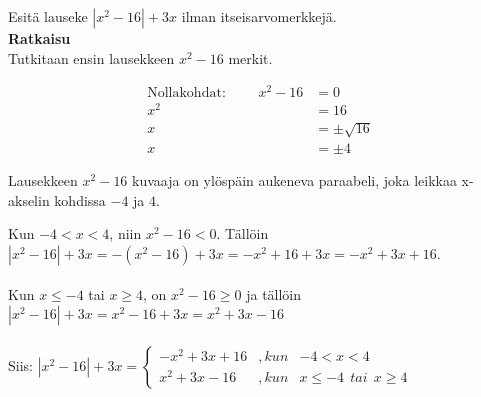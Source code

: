 \begin{esimerkki}
	Esitä lauseke $|x^2-16|+3x$ ilman itseisarvomerkkejä.\\
	\textbf{Ratkaisu} \\
	Tutkitaan ensin lausekkeen $x^2-16$ merkit.
	
	\begin{align*}
		\text{Nollakohdat: } \qquad	x^2-16 &=0 \\
			x^2 &=16 \\
			x &=\pm\sqrt{16} \\
			x &=\pm 4
	\end{align*}
	
	Lausekkeen $x^2-16$ kuvaaja on ylöspäin aukeneva paraabeli, joka leikkaa x-akselin kohdissa $-4$ ja $4$.
	
% 
%


\begin{lukusuora}{-10}{10}{8}
\end{lukusuora}

Kun $-4<x<4$, niin $x^2-16<0$. Tällöin \\
 $|x^2-16|+3x = -(x^2-16)+3x = -x^2+16+3x=-x^2+3x+16$. \\
 \\
 Kun $x\leq-4$ tai $x\geq4$, on $x^2-16\geq0$ ja tällöin\\
 $|x^2-16|+3x =x^2-16+3x=x^2+3x-16$ \\
 \\
 Siis:
			$|x^2-16|+3x= \left \{ \begin{array}{rcl}
			-x^2+3x+16 & , kun & -4<x<4 \\
			x^2+3x-16 & , kun & x\leq-4 \ \ tai \ \ x\geq4
			\end{array}\right.$

\end{esimerkki}

